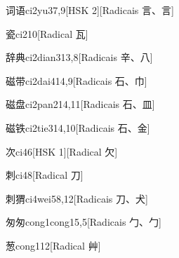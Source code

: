 \begin{entry}{词语}{ci2yu3}{7,9}[HSK 2][Radicais ⾔、⾔]
\end{entry}

\begin{entry}{瓷}{ci2}{10}[Radical ⽡]
\end{entry}

\begin{entry}{辞典}{ci2dian3}{13,8}[Radicais ⾟、⼋]
\end{entry}

\begin{entry}{磁带}{ci2dai4}{14,9}[Radicais ⽯、⼱]
\end{entry}

\begin{entry}{磁盘}{ci2pan2}{14,11}[Radicais ⽯、⽫]
\end{entry}

\begin{entry}{磁铁}{ci2tie3}{14,10}[Radicais ⽯、⾦]
\end{entry}

\begin{entry}{次}{ci4}{6}[HSK 1][Radical ⽋]
\end{entry}

\begin{entry}{刺}{ci4}{8}[Radical ⼑]
\end{entry}

\begin{entry}{刺猬}{ci4wei5}{8,12}[Radicais ⼑、⽝]
\end{entry}

\begin{entry}{匆匆}{cong1cong1}{5,5}[Radicais ⼓、⼓]
\end{entry}

\begin{entry}{葱}{cong1}{12}[Radical ⾋]
\end{entry}


